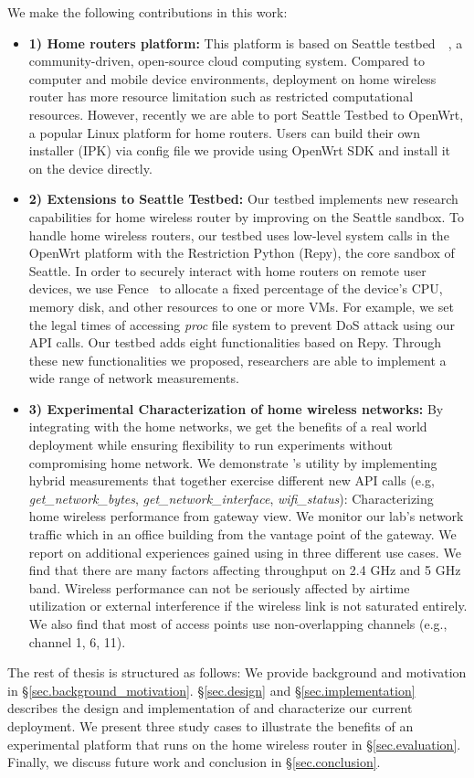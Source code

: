 We make the following contributions in this work:
\begin{itemize}
\item\textbf{1) Home routers platform:} This platform is based on Seattle testbed~\cite{zhuang2013experience}~\cite{cappos2009seattle}, a community-driven, open-source cloud computing system. Compared to computer and mobile device environments, deployment on home wireless router has more resource limitation such as restricted computational resources. However, recently we are able to port Seattle Testbed to OpenWrt, a popular Linux platform for home routers\cite{openwrt}. Users can build their own \sysname installer (IPK) via config file we provide using OpenWrt SDK and install it on the device directly. 
\item\textbf{2) Extensions to Seattle Testbed:}  Our testbed implements new research capabilities for home wireless router by improving on the Seattle sandbox. To handle home wireless routers, our testbed uses low-level system calls in the OpenWrt platform with the Restriction Python (Repy)\cite{cappos2010retaining}, the core sandbox of Seattle. In order to securely interact with home routers on remote user devices, we use Fence~\cite{li2015fence} to allocate a fixed percentage of the device's CPU, memory disk, and other resources to one or more VMs. For example, we set the legal times of accessing \textit{proc} file system to prevent DoS attack using our API calls. Our testbed adds eight functionalities based on Repy. Through these new functionalities we proposed, researchers are able to implement a wide range of network measurements.
\item\textbf{3) Experimental Characterization of home wireless networks:} By integrating \sysname with the home networks, we get the benefits of a real world deployment while ensuring flexibility to run experiments without compromising home network. We demonstrate \sysname's utility by implementing hybrid measurements that together exercise different new API calls (e.g, \textit{get\_network\_bytes}, \textit{get\_network\_interface}, \textit{wifi\_status}): Characterizing home wireless performance from gateway view. We monitor our lab's network traffic which in an office building from the vantage point of the gateway. We report on additional experiences gained using \sysname in three different use cases. We find that there are many factors affecting throughput on 2.4 GHz and 5 GHz band. Wireless performance can not be seriously affected by airtime utilization or external interference if the wireless link is not saturated entirely. We also find that most of access points use non-overlapping channels (e.g., channel 1, 6, 11). 
\end{itemize}

The rest of thesis is structured as follows: We provide background and motivation in \S{\ref{sec.background_motivation}}. \S{\ref{sec.design}} and \S{\ref{sec.implementation}} describes the design and implementation of \sysname and characterize our current deployment. We present three study cases to illustrate the benefits of an experimental platform that runs on the home wireless router in \S{\ref{sec.evaluation}}. Finally, we discuss future work and conclusion in \S{\ref{sec.conclusion}}. 